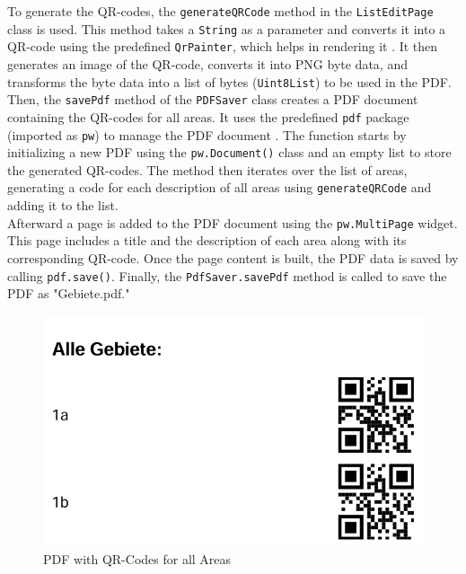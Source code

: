 To generate the QR-codes, the \texttt{generateQRCode} method in the \texttt{ListEditPage} class is used. This method takes a \texttt{String} as a parameter and converts it into a QR-code using the predefined \texttt{QrPainter}, which helps in rendering it \autocite{pub.dev/QrPainter-class}. It then generates an image of the QR-code, converts it into PNG byte data, and transforms the byte data into a list of bytes (\texttt{Uint8List}) to be used in the PDF. \\

Then, the \texttt{savePdf} method of the \texttt{PDFSaver} class creates a PDF document containing the QR-codes for all areas. It uses the predefined \texttt{pdf} package (imported as \texttt{pw}) to manage the PDF document \autocite{pub.dev/pdf}. The function starts by initializing a new PDF using the \texttt{pw.Document()} class and an empty list to store the generated QR-codes. The method then iterates over the list of areas, generating a code for each description of all areas using \texttt{generateQRCode} and adding it to the list.\\

Afterward a page is added to the PDF document using the \texttt{pw.MultiPage} widget. This page includes a title and the description of each area along with its corresponding QR-code. Once the page content is built, the PDF data is saved by calling \texttt{pdf.save()}. Finally, the \texttt{PdfSaver.savePdf} method is called to save the PDF as "Gebiete.pdf."

\begin{figure}[H]
    \centering
    \includegraphics[width=0.5\linewidth]{images/AdminPanel/GebietePDF.png}
    \caption{PDF with QR-Codes for all Areas}
\end{figure}


